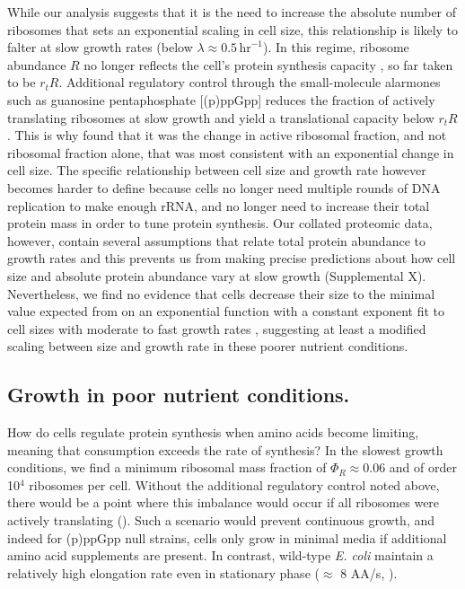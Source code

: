 While our analysis suggests that it is the need to increase the absolute number
of ribosomes that sets an exponential scaling in cell size, this relationship is
likely to falter at slow growth rates (below $\lambda \approx
0.5\,\text{hr}^{-1}$). In this regime, ribosome abundance $R$ no longer reflects
the cell's protein synthesis capacity \citep{dai2016}, so far taken to be $r_t
R$. Additional regulatory control through the small-molecule alarmones such as
guanosine pentaphosphate [(p)ppGpp] reduces the fraction of actively translating
ribosomes at slow growth and yield a translational capacity below $r_t R$. This
is why \cite{si2017} found that it was the change in active ribosomal fraction,
and not ribosomal fraction alone, that was most consistent with an exponential
change in cell size. The specific relationship between cell size and growth rate
however becomes harder to define because cells no longer need multiple rounds of
DNA replication to make enough rRNA, and no longer need to increase their total
protein mass in order to tune protein synthesis. Our collated proteomic data,
however, contain several assumptions that relate total protein abundance to
growth rates and this prevents us from making precise predictions about how cell
size and absolute protein abundance vary at slow growth (Supplemental X).
Nevertheless, we find no evidence that cells decrease their size to the minimal
value expected from on an exponential function with a constant exponent fit to
cell sizes with moderate to fast growth rates \citep{basan2015, radzikowski2016,
si2019}, suggesting at least a modified scaling between size and growth rate in
these poorer nutrient conditions.

\subsection{Growth in poor nutrient conditions.}

How do cells regulate protein synthesis when amino acids become limiting,
meaning that consumption exceeds the rate of synthesis? In the slowest  growth
conditions, we find a minimum ribosomal mass fraction of $\Phi_R \approx 0.06$
and  of order 10$^4$ ribosomes per cell.   Without the additional regulatory
control noted above, there would be a point where  this imbalance would occur if
all ribosomes were actively translating  (). Such a
scenario would prevent continuous growth, and indeed for (p)ppGpp null strains,
cells only grow in minimal media if additional amino acid supplements are
present. In contrast, wild-type \textit{E. coli} maintain a relatively high
elongation rate even in stationary phase ($\approx$ 8 AA/s, \citep{dai2016,
dai2018}).

